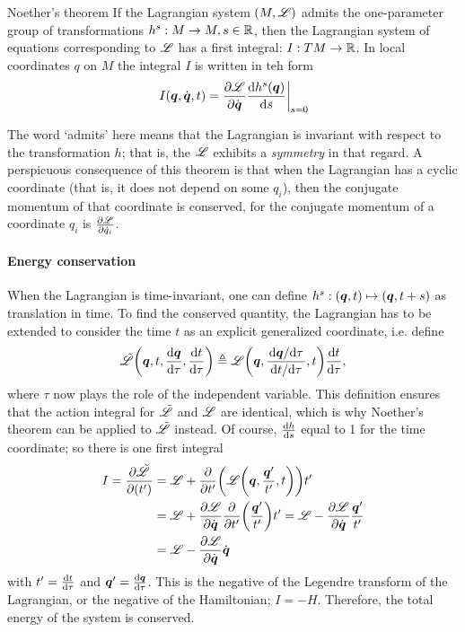 \begin{thmblock}{Noether's theorem}
    If the Lagrangian system $(M, \mathscr{L})$ admits the one-parameter group of transformations $h^s: M \to M, s \in \mathbb{R}$, then the Lagrangian system of equations corresponding to $\mathscr{L}$ has a first integral: $I: TM \to \mathbb{R}$. In local coordinates $q$ on $M$ the integral $I$ is written in teh form 
    $$ \left. I(\vb*{q}, \dot{\vb*{q}}, t) = \pdv{\ensuremath{\mathscr{L}}}{\ensuremath{\dot{\vb*{q}}}}\dv{h^s(\ensuremath{\vb*{q}})}{s}\right |_{s = 0} $$
\end{thmblock}
The word `admits' here means that the Lagrangian is invariant with respect to the transformation $h$; that is, the $\mathscr{L}$ exhibits a \emph{symmetry} in that regard. A perspicuous consequence of this theorem is that when the Lagrangian has a cyclic coordinate (that is, it does not depend on some $q_i$), then the conjugate momentum of that coordinate is conserved, for the conjugate momentum of a coordinate $q_i$ is $\pdv{\ensuremath{\mathscr{L}}}{\dot{q}_i}$.

\paragraph{Energy conservation} When the Lagrangian is time-invariant, one can define $h^s: (\vb*{q}, t) \mapsto (\vb*{q}, t + s)$ as translation in time. To find the conserved quantity, the Lagrangian has to be extended to consider the time $t$ as an explicit generalized coordinate, i.e. define
$$ \tilde{\mathscr{L}}\qty(\vb*{q}, t, \dv{\ensuremath{\vb*{q}}}{\tau}, \dv{t}{\tau}) \triangleq \mathscr{L}\qty(\vb*{q}, \frac{\dv*{\vb*{q}}{\tau}}{\dv*{t}{\tau}}, t)\dv{t}{\tau},$$
where $\tau$ now plays the role of the independent variable. This definition ensures that the action integral for $\tilde{\mathscr{L}}$ and $\mathscr{L}$ are identical, which is why Noether's theorem can be applied to $\tilde{\mathscr{L}}$ instead. Of course, $\dv{h}{s}$ equal to 1 for the time coordinate; so there is one first integral
\begin{equation*}
    \begin{split}
        I = \pdv{\tilde{\ensuremath{\mathscr{L}}}}{(t')} 
        &= \mathscr{L} + \pdv{}{t'}\qty(\mathscr{L}\qty(\vb*{q}, \frac{
        \vb*{q}'}{t'}, t))t'\\
        &= \mathscr{L} + \pdv{\ensuremath{\mathscr{L}}}{\ensuremath{\dot{\vb*{q}}}}\pdv{}{t'}\qty(\frac{
        \vb*{q}'}{t'})t' = \mathscr{L} - \pdv{\ensuremath{\mathscr{L}}}{\ensuremath{\dot{\vb*{q}}}}\frac{\vb*{q}'}{t'}\\
        &= \mathscr{L} - \pdv{\ensuremath{\mathscr{L}}}{\ensuremath{\dot{\vb*{q}}}}\dot{\vb*{q}}
    \end{split}
\end{equation*}
with $t' = \dv{t}{\tau}$ and $\vb*{q}' = \dv{\ensuremath{\vb*{q}}}{\tau}$. This is the negative of the Legendre transform of the Lagrangian, or the negative of the Hamiltonian; $I = -H$. Therefore, the total energy of the system is conserved. 

